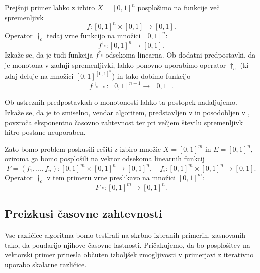 Prejšnji primer lahko z izbiro \(X = [0,1]^n\) posplošimo na funkcije več spremenljivk
\[
  f \colon [0,1]^n \times [0,1] \to [0,1].
\]
Operator \(\dagger_c\) tedaj vrne funkcijo na množici \([0,1]^n\):
\[
  f^{\dagger_c} \colon [0,1]^n \to [0,1].
\]
Izkaže se, da je tudi funkcija \(f^{\dagger_c}\) odsekoma linearna. Ob dodatni predpostavki, da je monotona v zadnji spremenljivki, lahko ponovno uporabimo operator \(\dagger_c\) (ki zdaj deluje na množici \([0,1]^{[0,1]^n}\)) in tako dobimo funkcijo
\[
  f^{\dagger_c \dagger_c} \colon [0,1]^{n-1} \to [0,1].
\]

Ob ustreznih predpostavkah o monotonosti lahko ta postopek nadaljujemo. Izka\-že se, da je to smiselno, vendar algoritem, predstavljen v \cite{zbMATH06805750} in posodobljen v \cite{Petkovic2017}, povzroča eksponentno časovno zahtevnost ter pri večjem številu spremenljivk hitro postane neuporaben.

Zato bomo problem poskusili rešiti z izbiro množic \(X = [0,1]^m\) in \(E = [0,1]^n\), oziroma ga bomo posplošili na vektor odsekoma linearnih funkcij
\[
  F = (f_1, \ldots, f_n) \colon [0,1]^m \times [0,1]^n \to [0,1]^n,
  \quad
  f_i \colon [0,1]^m \times [0,1]^n \to [0,1].
\]
Operator \(\dagger_c\) v tem primeru vrne preslikavo na množici \([0,1]^m\):
\[
  F^{\dagger_c} \colon [0,1]^m \to [0,1]^n.
\]

\subsection{Preizkusi časovne zahtevnosti}
Vse različice algoritma bomo testirali na skrbno izbranih primerih, zasnovanih tako, da poudarijo njihove časovne lastnosti. Pričakujemo, da bo posplošitev na vektorski primer prinesla občuten izboljšek zmogljivosti v primerjavi z iterativno uporabo skalarne različice.
